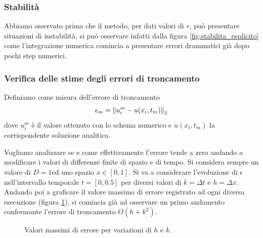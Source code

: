 \documentclass[10pt,a4paper]{article}
\begin{document}
\subsubsection{Stabilità}

Abbiamo osservato prima che il metodo, per dati valori di $r$, può presentare situazioni di instabilità, si può osservare infatti dalla figura \ref{fig:stabilita_esplicito} come l'integrazione numerica comincia a presentare errori drammatici già dopo pochi step numerici.

\subsubsection{Verifica delle stime degli errori di troncamento}
\label{subsec:tronc_exp}
Definiamo come misura dell'errore di troncamento
\begin{equation}
	\epsilon_m = \norm{u_i^m - u(x_i,t_m)}_2
\end{equation}
dove $u_i^m$ è il valore ottenuto con lo schema numerico e $u(x_i,t_m)$ la corrispondente soluzione analitica.

Vogliamo analizzare se e come effettivamente l'errore tende a zero andando a modificare i valori di differenze finite di spazio e di tempo. Si considera sempre un valore di $D = 1$ed uno spazio $x \in [0,1]$. Si va a considerare l'evoluzione di $\epsilon$ nell'intervallo temporale $t=[0,0.5]$ per diversi valori di $k = \Delta t$ e $h = \Delta x$. Andando poi a graficare il valore massimo di errore registrato ad ogni diversa esecuzione (figura \ref{fig:explicito}), si comincia già ad osservare un primo andamento confermante l'errore di troncamento $O(h+k^2)$.

\begin{figure}
	\centering
	\quad
	\caption{Valori massimi di errore per variazioni di $h$ e $k$.}
	\label{fig:explicito}
\end{figure}
\end{document}
